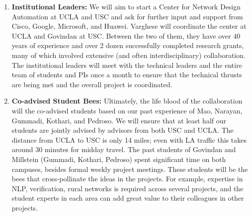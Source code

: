 \documentclass[10pt]{article}
\begin{document}
{\begin{enumerate}
Each is excited about leading and coordination their technical
thrusts across projects: Netravali will lead the project on mapping from operator concerns to
network DSL queries but he will participate the in the router primitive project with Tamir and
Varghese to  integrate from high level queries down  to router primitives.  He will also work
with Govindan and Varghese on automatically mining long term insights from operator logs which requires harnessing NLP as does the debugging thrust.

Raghavan will lead and coordinate the topology design (with Govindan and Varghese) and scripting (with Govindan, Millstein, and Varghese) starting with Motech and moving to Grameen.  Funds have been allocated for foreign travel to coordinate with Grameen and our collaborator Ashwin Gumaste in IIT Mumbai who will help us with a telesurgery application on his platform in IIT Mumbai.

\item \textbf{Institutional Leaders:} We will aim to start a Center for Network Design Automation
at UCLA and USC and ask for further input and support from Cisco, Google, Microsoft, and Huawei.
Varghese will coordinate the center at UCLA and Govindan at USC.  Between the two of them, they have over 40 years of experience and over 2 dozen successfully completed research grants, many
of which involved extensive (and often interdisciplinary) collaboration.  The institutional leaders
will meet with the technical leaders and the entire team of students and PIs once a month to ensure that the technical thrusts are being met and the overall project is coordinated.



\item \textbf{Co-advised Student Bees:} Ultimately, the life blood of the collaboration will the co-advised students based on our past experience of Mao, Narayan, Gummadi, Kothari, and Pedroso.  We will ensure that at least half our students are jointly advised by advisors from both USC and
UCLA.  The distance from UCLA to USC is only 14 miles; even with LA traffic this takes around 30 minutes for midday travel.  The past students of Govindan and Millstein (Gummadi, Kothari, Pedroso) spent significant time on both campuses, besides formal weekly project meetings.
These students will be the bees that cross-pollinate the ideas in the projects.  For example,
expertise in NLP, verification, rural networks is required across several projects, and the student
experts in each area can add great value to their colleagues in other projects.


\end{enumerate}}
\end{document}
